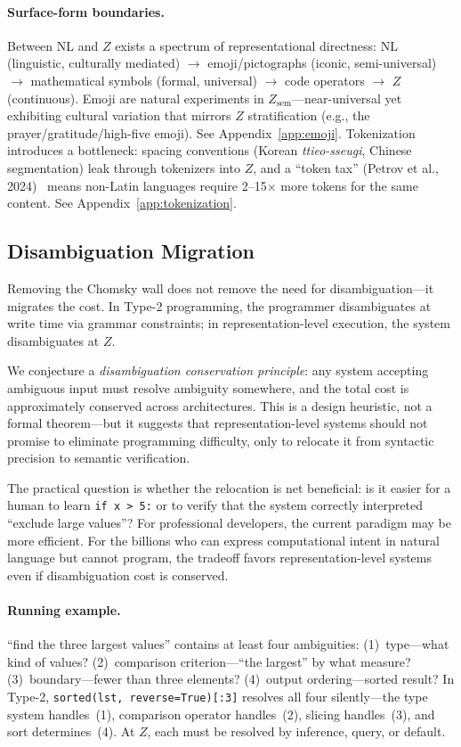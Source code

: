 \documentclass[11pt]{article}
\theoremstyle{definition}
\newcommand{\Zsem}{Z_{\text{sem}}}
\begin{document}
\paragraph{Surface-form boundaries.}
Between NL and $Z$ exists a spectrum of representational directness: NL (linguistic, culturally mediated) $\to$ emoji/pictographs (iconic, semi-universal) $\to$ mathematical symbols (formal, universal) $\to$ code operators $\to$ $Z$ (continuous). Emoji are natural experiments in $\Zsem$---near-universal yet exhibiting cultural variation that mirrors $Z$ stratification (e.g., the prayer/gratitude/high-five emoji). See Appendix~\ref{app:emoji}. Tokenization introduces a bottleneck: spacing conventions (Korean \emph{ttieo-sseugi}, Chinese segmentation) leak through tokenizers into $Z$, and a ``token tax'' (Petrov et al., 2024)~\cite{petrov2024tokenizers} means non-Latin languages require 2--15$\times$ more tokens for the same content. See Appendix~\ref{app:tokenization}.

\subsection{Disambiguation Migration}\label{sec:disambiguation}

Removing the Chomsky wall does not remove the need for disambiguation---it migrates the cost. In Type-2 programming, the programmer disambiguates at write time via grammar constraints; in representation-level execution, the system disambiguates at $Z$.

We conjecture a \emph{disambiguation conservation principle}: any system accepting ambiguous input must resolve ambiguity somewhere, and the total cost is approximately conserved across architectures. This is a design heuristic, not a formal theorem---but it suggests that representation-level systems should not promise to eliminate programming difficulty, only to relocate it from syntactic precision to semantic verification.

The practical question is whether the relocation is net beneficial: is it easier for a human to learn \texttt{if x > 5:} or to verify that the system correctly interpreted ``exclude large values''? For professional developers, the current paradigm may be more efficient. For the billions who can express computational intent in natural language but cannot program, the tradeoff favors representation-level systems even if disambiguation cost is conserved.

\paragraph{Running example.}
``find the three largest values'' contains at least four ambiguities: (1)~type---what kind of values? (2)~comparison criterion---``the largest'' by what measure? (3)~boundary---fewer than three elements? (4)~output ordering---sorted result? In Type-2, \texttt{sorted(lst, reverse=True)[:3]} resolves all four silently---the type system handles~(1), comparison operator handles~(2), slicing handles~(3), and sort determines~(4). At $Z$, each must be resolved by inference, query, or default.
\end{document}
